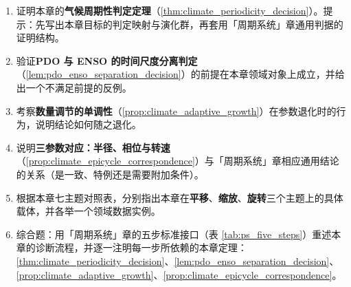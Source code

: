 \begin{enumerate}[leftmargin=3em, label=\textbf{题 \arabic*}]
    \item 证明本章的\textbf{气候周期性判定定理}（\ref{thm:climate_periodicity_decision}）。提示：先写出本章目标的判定映射与演化群，再套用「周期系统」章通用判据的证明结构。

    \item 验证\textbf{PDO 与 ENSO 的时间尺度分离判定}（\ref{lem:pdo_enso_separation_decision}）的前提在本章领域对象上成立，并给出一个不满足前提的反例。

    \item 考察\textbf{数量调节的单调性}（\ref{prop:climate_adaptive_growth}）在参数退化时的行为，说明结论如何随之退化。

    \item 说明\textbf{三参数对应：半径、相位与转速}（\ref{prop:climate_epicycle_correspondence}）与「周期系统」章相应通用结论的关系（是一致、特例还是需要附加条件）。

    \item 根据本章七主题对照表，分别指出本章在\textbf{平移}、\textbf{缩放}、\textbf{旋转}三个主题上的具体载体，并各举一个领域数据实例。

    \item 综合题：用「周期系统」章的五步标准接口（表 \ref{tab:ps_five_steps}）重述本章的诊断流程，并逐一注明每一步所依赖的本章定理：\ref{thm:climate_periodicity_decision}、\ref{lem:pdo_enso_separation_decision}、\ref{prop:climate_adaptive_growth}、\ref{prop:climate_epicycle_correspondence}。
\end{enumerate}


